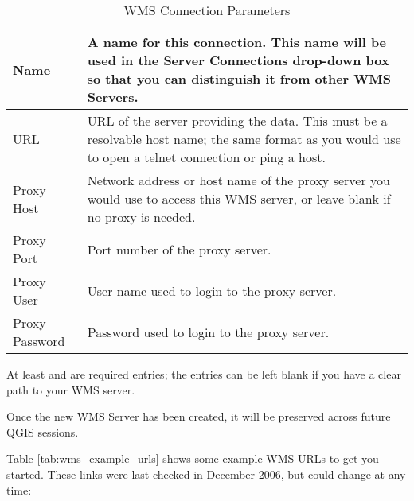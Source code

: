 \begin{table}[h]
\centering
\caption{WMS Connection Parameters}\label{tab:wms_connection_parms}\medskip
 \begin{tabular}{|l|p{5in}|}
\hline Name & A name for this connection.  This name will be used in the
 Server Connections drop-down box so that you can distinguish it from
 other WMS Servers. \\
\hline URL \index{WMS!URL} & URL of the server providing the data.
 This must be a resolvable host name; the same format as you would use 
 to open a telnet connection or ping a host. \\
\hline Proxy Host & Network address or host name of the proxy server
 you would use to access this WMS server, or leave blank if no proxy is needed. \\
\hline Proxy Port & Port number of the proxy server. \\
\hline Proxy User & User name used to login to the proxy server. \\
\hline Proxy Password & Password used to login to the proxy server. \\
\hline
\end{tabular}
\end{table}

At least  and  are required entries; the
 entries 
can be left blank if you have a clear path to your WMS server.

Once the new WMS Server has been created, it will be preserved across future 
QGIS sessions.

\begin{Tip}[h]\caption{\textsc{On WMS Server URLs}}
\end{Tip}

Table \ref{tab:wms_example_urls} shows some example WMS URLs to get you started.
These links were last checked in December 2006, but could change at any time:


